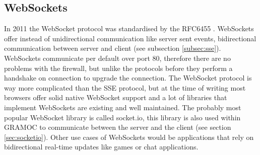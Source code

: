 \subsection{WebSockets}
In 2011 the WebSocket protocol was standardised by the RFC6455 \autocite{rfc6455}. WebSockets offer instead of unidirectional communication like server sent events, bidirectional communication between server and client (see subsection \vref{subsec:sse}). WebSockets communicate per default over port 80, therefore there are no problems with the firewall, but unlike the protocols before they perform a handshake on connection to upgrade the connection. The WebSocket protocol is way more complicated than the SSE protocol, but at the time of writing most browsers offer solid native WebSocket support and a lot of libraries that implement WebSockets are existing and well maintained. The probably most popular WebSocket library is called socket.io, this library is also used within GRAMOC to communicate between the server and the client (see section \vref{sec:socketio}). Other use cases of WebSockets would be applications that rely on bidirectional real-time updates like games or chat applications.

